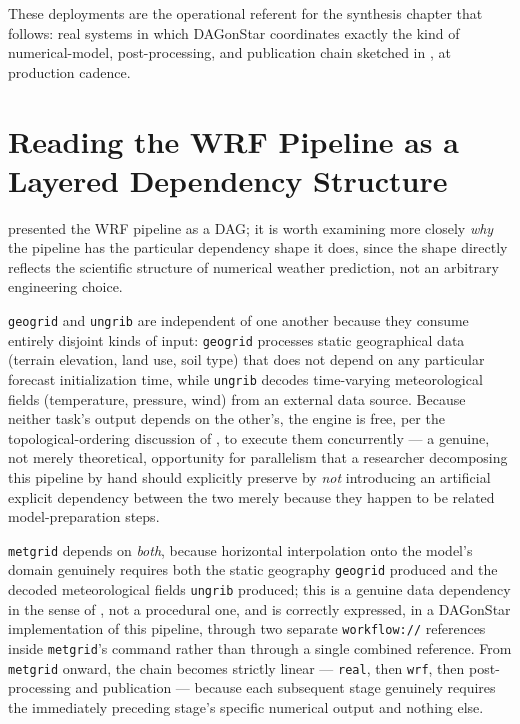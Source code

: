 These deployments are the operational referent for the synthesis chapter
that follows: real systems in which DAGonStar coordinates exactly the kind of
numerical-model, post-processing, and publication chain sketched in
, at production cadence.

\section{Reading the WRF Pipeline as a Layered Dependency Structure}

 presented the WRF pipeline as a DAG; it is worth
examining more closely \emph{why} the pipeline has the particular dependency
shape it does, since the shape directly reflects the scientific structure
of numerical weather prediction, not an arbitrary engineering choice.

\texttt{geogrid} and \texttt{ungrib} are independent of one another because
they consume entirely disjoint kinds of input: \texttt{geogrid} processes
static geographical data (terrain elevation, land use, soil type) that does
not depend on any particular forecast initialization time, while
\texttt{ungrib} decodes time-varying meteorological fields (temperature,
pressure, wind) from an external data source. Because neither task's output
depends on the other's, the engine is free, per the topological-ordering
discussion of , to execute them concurrently
--- a genuine, not merely theoretical, opportunity for parallelism that a
researcher decomposing this pipeline by hand should explicitly preserve by
\emph{not} introducing an artificial explicit dependency between the two
merely because they happen to be related model-preparation steps.

\texttt{metgrid} depends on \emph{both}, because horizontal interpolation
onto the model's domain genuinely requires both the static geography
\texttt{geogrid} produced and the decoded meteorological fields
\texttt{ungrib} produced; this is a genuine data dependency in the sense of
, not a procedural one, and is correctly expressed,
in a DAGonStar implementation of this pipeline, through two separate
\texttt{workflow://} references inside \texttt{metgrid}'s command rather
than through a single combined reference. From \texttt{metgrid} onward, the
chain becomes strictly linear --- \texttt{real}, then \texttt{wrf}, then
post-processing and publication --- because each subsequent stage
genuinely requires the immediately preceding stage's specific numerical
output and nothing else.

